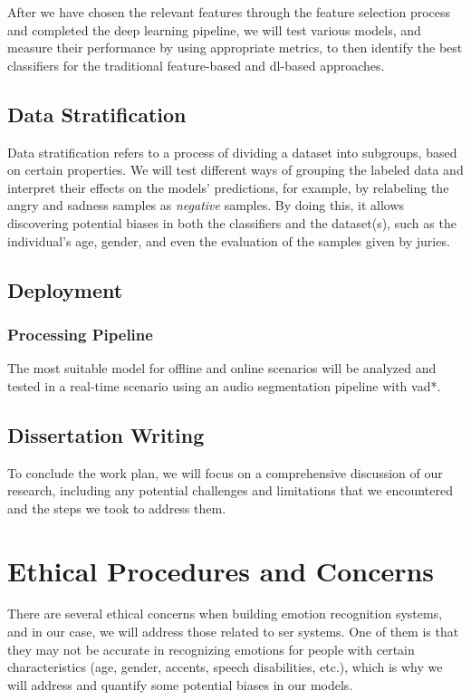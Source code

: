 After we have chosen the relevant features through the feature selection process and completed the deep learning pipeline, we will test various models, and measure their performance by using appropriate metrics, to then identify the best classifiers for the traditional feature-based and \ac{dl}-based approaches.


\subsection{Data Stratification}

Data stratification refers to a process of dividing a dataset into subgroups, based on certain properties. We will test different ways of grouping the labeled data and interpret their effects on the models' predictions, for example, by relabeling the angry and sadness samples as \textit{negative} samples. By doing this, it allows discovering potential biases in both the classifiers and the dataset(s), such as the individual's age, gender, and even the evaluation of the samples given by juries.


\subsection{Deployment}

\subsubsection{Processing Pipeline}

The most suitable model for offline and online scenarios will be analyzed and tested in a real-time scenario using an audio segmentation pipeline with \ac{vad*}.

\subsection{Dissertation Writing}

To conclude the work plan, we will focus on a comprehensive discussion of our research, including any potential challenges and limitations that we encountered and the steps we took to address them.

\section{Ethical Procedures and Concerns}

There are several ethical concerns when building emotion recognition systems, and in our case, we will address those related to \ac{ser} systems. One of them is that they may not be accurate in recognizing emotions for people with certain characteristics (age, gender, accents, speech disabilities, etc.), which is why we will address and quantify some potential biases in our models.

